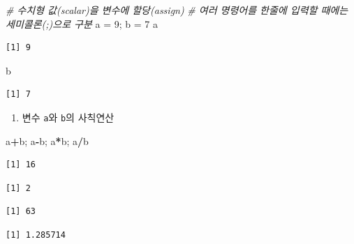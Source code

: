 \documentclass[
  11pt,
]{krantz}
\newenvironment{Shaded}{\begin{snugshade}}{\end{snugshade}}
\newcommand{\CommentTok}[1]{\textcolor[rgb]{0.37,0.37,0.37}{\textit{#1}}}
\newcommand{\DecValTok}[1]{\textcolor[rgb]{0.06,0.06,0.06}{#1}}
\newcommand{\NormalTok}[1]{#1}
\newcommand{\OperatorTok}[1]{\textcolor[rgb]{0.43,0.43,0.43}{\textbf{#1}}}
\newcommand{\StringTok}[1]{\textcolor[rgb]{0.5,0.5,0.5}{#1}}
\providecommand{\tightlist}{%
  \setlength{\itemsep}{0pt}\setlength{\parskip}{0pt}}
\begin{document}
\footnotesize

\begin{Shaded}
\begin{Highlighting}[]
\CommentTok{# 수치형 값(scalar)을 변수에 할당(assign)}
\CommentTok{# 여러 명령어를 한줄에 입력할 때에는 세미콜론(;)으로 구분}
\NormalTok{a =}\StringTok{ }\DecValTok{9}\NormalTok{; b =}\StringTok{ }\DecValTok{7}
\NormalTok{a}
\end{Highlighting}
\end{Shaded}

\begin{verbatim}
[1] 9
\end{verbatim}

\begin{Shaded}
\begin{Highlighting}[]
\NormalTok{b}
\end{Highlighting}
\end{Shaded}

\begin{verbatim}
[1] 7
\end{verbatim}

\normalsize

\begin{enumerate}
\def\labelenumi{\arabic{enumi}.}
\setcounter{enumi}{3}
\tightlist
\item
  변수 \texttt{a}와 \texttt{b}의 사칙연산
\end{enumerate}

\footnotesize

\begin{Shaded}
\begin{Highlighting}[]
\NormalTok{a}\OperatorTok{+}\NormalTok{b; a}\OperatorTok{-}\NormalTok{b; a}\OperatorTok{*}\NormalTok{b; a}\OperatorTok{/}\NormalTok{b}
\end{Highlighting}
\end{Shaded}

\begin{verbatim}
[1] 16
\end{verbatim}

\begin{verbatim}
[1] 2
\end{verbatim}

\begin{verbatim}
[1] 63
\end{verbatim}

\begin{verbatim}
[1] 1.285714
\end{verbatim}
\end{document}

